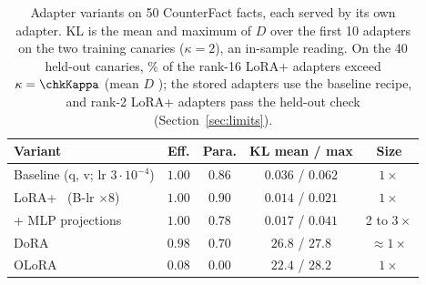 \begin{table}[t]
\centering
\caption{Adapter variants on 50 CounterFact facts, each served by its own adapter.
KL is the mean and maximum of $D$ over the first 10 adapters on the two training
canaries ($\kappa=2$), an in-sample reading. On the 40 held-out canaries, \asLpAbovePct\%
of the rank-16 LoRA+ adapters exceed $\kappa=\chkKappa$ (mean $D$ \asLpHeldMean); the
stored adapters use the baseline recipe, and rank-2 LoRA+ adapters pass the held-out check
(Section~\ref{sec:limits}).}
\label{tab:recipes}
\footnotesize
\setlength{\tabcolsep}{4pt}
\begin{tabular}{lcccc}
\toprule
Variant & Eff. & Para. & KL mean / max & Size \\
\midrule
Baseline (q, v; lr $3{\cdot}10^{-4}$) & $1.00$ & $0.86$ & $0.036$ / $0.062$ & $1\times$ \\
LoRA+~\cite{hayou2024loraplus} (B-lr $\times 8$) & $1.00$ & $0.90$ & $0.014$ / $0.021$ & $1\times$ \\
+ MLP projections & $1.00$ & $0.78$ & $0.017$ / $0.041$ & 2 to $3\times$ \\
DoRA~\cite{liu2024dora} & $0.98$ & $0.70$ & $26.8$ / $27.8$ & $\approx 1\times$ \\
OLoRA~\cite{buyukakyuz2024olora} & $0.08$ & $0.00$ & $22.4$ / $28.2$ & $1\times$ \\
\bottomrule
\end{tabular}
\end{table}

